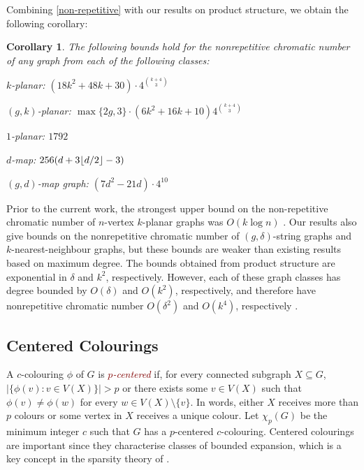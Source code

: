 \documentclass{patmorin}
\theoremstyle{plain}
\newtheorem{cor}[thm]{Corollary}
\theoremstyle{definition}
\newcommand{\defin}[1]{\textcolor{Maroon}{\emph{#1}}}
\DeclarePairedDelimiter{\floor}{\lfloor}{\rfloor}
\begin{document}
Combining \cref{non-repetitive} with our results on product structure, we obtain the following corollary:
\begin{cor}\label{nonrepetitive_cor}
  The following bounds hold for the nonrepetitive chromatic number of any graph from each of the following classes:
  \begin{compactenum}
    \item $k$-planar: $(18k^2+48k+30)\cdot 4^{\binom{k+4}{3}}$
    \item $(g,k)$-planar: $\max\{2g,3\}\cdot(6k^2+16k+10) 4^{\binom{k+4}{3}}$
    \item $1$-planar: $1792$
    \item $d$-map: $256(d+3\floor{d/2}-3)$
    \item $(g,d)$-map graph: $(7d^2-21d)\cdot 4^{10}$
  \end{compactenum}
\end{cor}

Prior to the current work, the strongest upper bound on the non-repetitive chromatic number of $n$-vertex  $k$-planar graphs was $O(k\log n)$ \cite{dujmovic.morin.ea:layered}.  Our results also give bounds on the nonrepetitive chromatic number of $(g,\delta)$-string graphs and $k$-nearest-neighbour graphs, but these bounds are weaker than existing results based on maximum degree.  The bounds obtained from product structure are exponential in $\delta$ and $k^2$, respectively.  However, each of these graph classes has degree bounded by $O(\delta)$ and $O(k^2)$, respectively, and therefore have nonrepetitive chromatic number $O(\delta^2)$ and $O(k^{4})$, respectively \cite{DJKW16}.

\subsection{Centered Colourings}
\label{centered-colourings}

A $c$-colouring $\phi$ of $G$ is \defin{$p$-centered} if, for every connected subgraph $X\subseteq G$, $|\{\phi(v):v\in V(X)\}| > p$ or there exists some $v\in V(X)$ such that $\phi(v)\neq \phi(w)$ for every $w\in V(X)\setminus\{v\}$.  In words, either $X$ receives more than $p$ colours or some vertex in $X$ receives a unique colour.  Let $\chi_p(G)$ be the minimum integer $c$ such that $G$ has a $p$-centered $c$-colouring. Centered colourings are important since they characterise classes of bounded expansion, which is a key concept in the sparsity theory of \citet{Sparsity}.
\end{document}
